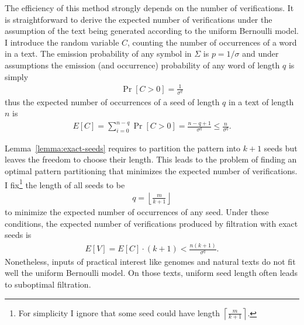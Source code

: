 The efficiency of this method strongly depends on the number of verifications.
It is straightforward to derive the expected number of verifications under the assumption of the text being generated according to the uniform Bernoulli model.
I introduce the random variable $C$, counting the number of occurrences of a word in a text.
The emission probability of any symbol in $\Sigma$ is $p = 1/\sigma$ and under \iid assumptions the emission (and occurrence) probability of any word of length $q$ is simply
\begin{eqnarray}
\Pr[C > 0] = \frac{1}{\sigma^q}
\end{eqnarray}
thus the expected number of occurrences of a seed of length $q$ in a text of length $n$ is
\begin{eqnarray}
E[C] = \sum_{i=0}^{n-q}{\Pr[C > 0]} = \frac{n - q + 1}{\sigma^q} \leq \frac{n}{\sigma^q}.
\end{eqnarray}

Lemma~\ref{lemma:exact-seeds} requires to partition the pattern into $k+1$ seeds but leaves the freedom to choose their length.
This leads to the problem of finding an optimal pattern partitioning that minimizes the expected number of verifications.
I fix\footnote{For simplicity I ignore that some seed could have length $\left \lceil \frac{m}{k+1} \right \rceil$.} the length of all seeds to be
\begin{eqnarray}
\label{eq:seed-len}
q=\left \lfloor \frac{m}{k+1} \right \rfloor
\end{eqnarray}
to minimize the expected number of occurrences of any seed.
Under these conditions, the expected number of verifications produced by filtration with exact seeds is
\begin{eqnarray}
E[V] = E[C] \cdot (k + 1) < \frac{n (k + 1)}{\sigma^q}.
\end{eqnarray}
Nonetheless, inputs of practical interest like genomes and natural texts do not fit well the uniform Bernoulli model.
On those texts, uniform seed length often leads to suboptimal filtration.

